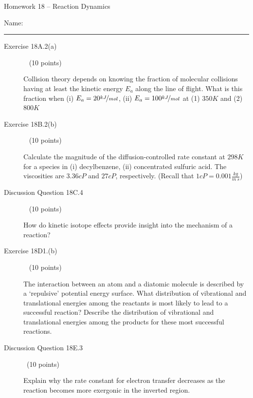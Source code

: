 \documentclass[12pt, openany, letterpaper]{memoir}
\begin{document}
\begin{center}
	{\large Homework 18 -- Reaction Dynamics}
\end{center}

Name: \rule[-.1mm]{15em}{0.1pt}


\begin{description}	
	\item [Exercise 18A.2(a)] ~ (10 points)
	
	Collision theory depends on knowing the fraction of molecular collisions having at least the kinetic energy $E_a$ along the line of flight. What is this fraction when (i) $E_a=20\nicefrac{kJ}{mol}$, (ii) $E_a=100\nicefrac{kJ}{mol}$ at (1) $350K$ and (2) $800K$ 
	
	\vspace{18em}
	\item [Exercise 18B.2(b)] ~ (10 points)

	Calculate the magnitude of the diffusion-controlled rate constant at $298K$ for a species in (i) decylbenzene, (ii) concentrated sulfuric acid. The viscosities are $3.36cP$ and $27cP$, respectively. (Recall that $1cP=0.001\frac{kg}{m~s}$)
	
	\vspace{18em}
	\item [Discussion Question 18C.4] ~ (10 points)
	
	How do kinetic isotope effects provide insight into the mechanism of a reaction?
	
	\vspace{14em}
	\item [Exercise 18D1.(b)] ~ (10 points)
	
	The interaction between an atom and a diatomic molecule is described by a `repulsive' potential energy surface. What distribution of vibrational and translational energies among the reactants is most likely to lead to a successful reaction? Describe the distribution of vibrational and translational energies among the products for these most successful reactions.
	
	\vspace{14em}
	\item [Discussion Question 18E.3] ~(10 points)
	
	Explain why the rate constant for electron transfer decreases as the reaction becomes more exergonic in the inverted region.
\end{description}
\newpage
\pagestyle{empty}
\addtocounter{page}{-1}
\end{document}

